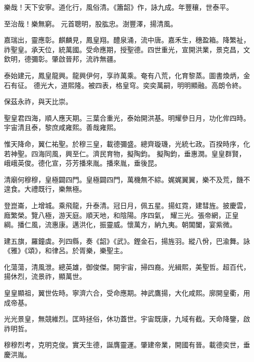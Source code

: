 \begin{pinyinscope}
 樂哉！天下安寧。道化行，風俗清。《簫韶》作，詠九成。年豐穰，世泰平。



 至治哉！樂無窮。
 元首聰明，股肱忠。澍豐澤，揚清風。



 嘉瑞出，靈應彰。麒麟見，鳳皇翔。醴泉涌，流中唐。嘉禾生，穗盈箱。降繁祉，祚聖皇。承天位，統萬國。受命應期，授聖德。四世重光，宣開洪業，景克昌，文欽明，德彌彰。肇啟晉邦，流祚無疆。



 泰始建元，鳳皇龍興。龍興伊何，享祚萬乘。奄有八荒，化育黎蒸。圖書煥炳，金石有征。
 德光大，道熙隆。被四表，格皇穹。奕奕萬嗣，明明顯融。高朗令終。



 保茲永祚，與天比崇。



 聖皇君四海，順人應天期。三葉合重光，泰始開洪基。明耀參日月，功化侔四時。宇宙清且泰，黎庶咸雍熙。善哉雍熙。



 惟天降命，翼仁祐聖。於穆三皇，載德彌盛。總齊璇璣，光統七政。百揆時序，化若神聖。四海同風，興至仁。濟民育物，擬陶鈞。
 擬陶鈞，垂惠潤。皇皇群賢，峨峨英俊。德化宣，芬芳播來胤。播來胤，垂後昆。



 清廟何穆穆，皇極闢四門。皇極闢四門，萬機無不綜。娓娓翼翼，樂不及荒，饑不遑食。大禮既行，樂無極。



 登崑崙，上增城。乘飛龍，升泰清。冠日月，佩五星。揚虹霓，建彗旌。披慶雲，廕繁榮。覽八極，游天庭。順天地，和陰陽。序四氣，
 耀三光。張帝網，正皇綱。播仁風，流惠康。邁洪化，振靈威。懷萬方，納九夷。朝閶闔，宴紫微。



 建五旗，羅鐘虡。列四縣，奏《韶》《武》。鏗金石，揚旌羽。縱八佾，巴渝舞。詠《雅》《頌》，和律呂。於胥樂，樂聖主。



 化蕩蕩，清風泄。總英雄，御俊傑。開宇宙，掃四裔。光緝熙，美聖哲。超百代，揚休烈，流景祚，顯萬世。



 皇皇顯祖，翼世佐時。寧濟六合，受命應期。神武鷹揚，大化咸熙。廓開皇衢，用成帝基。



 光光景皇，無競維烈。匡時拯俗，休功蓋世。宇宙既康，九域有截。天命降鑒，啟祚明哲。



 穆穆烈考，克明克俊。實天生德，誕膺靈運。肇建帝業，開國有晉。載德奕世，垂慶洪胤。




\end{pinyinscope}
